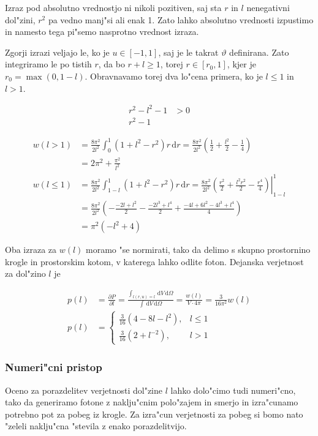 \documentclass[a4paper,10pt]{article}
\renewcommand{\theta}{\vartheta}
\newcommand{\dd}{\,\mathrm{d}}
\begin{document}
Izraz pod absolutno vrednostjo ni nikoli pozitiven, saj sta $r$ in $l$ nenegativni dol"zini, $r^2$ pa vedno manj"si ali enak 1. Zato lahko absolutno vrednosti izpustimo in namesto tega pi"semo nasprotno vrednost izraza. 


Zgorji izrazi veljajo le, ko je $u\in[-1,1]$, saj je le takrat $\theta$ definirana. Zato integriramo le po tistih $r$, da bo $r+l\geq 1$, torej $r\in[r_0,1]$, kjer je $r_0 = \max(0,1-l)$. Obravnavamo torej dva lo"cena primera, ko je $l\leq 1$ in $l>1$. 

\begin{align}
 r^2 - l^2 - 1 &> 0 \\
 r^2 - 1 
\end{align}


\begin{align}
w(l>1) &= \frac{8\pi^2}{2l^2}\int_0^1 (1 + l^2 - r^2 ) r \dd r = \frac{8\pi^2}{2l^2} \left(\frac{1}{2} + \frac{l^2}{2} - \frac{1}{4}\right) \\
 &= 2\pi^2 + \frac{\pi^2}{l^2} \\
w(l\leq 1) &= \frac{8\pi^2}{2l^2}\int_{1-l}^1 (1 + l^2 - r^2 ) r \dd r = \frac{8\pi^2}{2l^2} \left.\left(\frac{r^2}{2} + \frac{l^2r^2}{2} - \frac{r^4}{4}\right)\right|_{1-l}^{1} \\
&= \frac{8\pi^2}{2l^2} \left( - \frac{-2l+l^2}{2} - \frac{-2l^3+l^4}{2} + \frac{-4l+6l^2 - 4l^3 + l^4}{4}\right) \\
&= \pi^2 \left( -l^2 + 4 \right)
\end{align}

Oba izraza za $w(l)$ moramo "se normirati, tako da delimo s skupno prostornino krogle in prostorskim kotom, v katerega lahko odlite foton. Dejanska verjetnost za dol"zino $l$ je 

\begin{align}
 p(l) &= \frac{\partial P}{\partial l} = \frac{\int_{l(r,u)=l} \dd V \dd \Omega}{\int \dd V \dd \Omega} = \frac{w(l)}{ V \cdot 4\pi } = \frac{3}{16\pi^2}w(l)\\
 p(l) &= \left\{ \begin{matrix}
                  \frac{3}{16}(4-8l-l^2), & l \leq 1 \\
		  \frac{3}{16}(2 + l^{-2}), & l > 1
                 \end{matrix}
 \right.
\end{align}

\subsubsection{Numeri"cni pristop}
Oceno za porazdelitev verjetnosti dol"zine $l$ lahko dolo"cimo tudi numeri"cno, tako da generiramo fotone z naklju"cnim polo"zajem in smerjo in izra"cunamo potrebno pot za pobeg iz krogle. Za izra"cun verjetnosti za pobeg si bomo nato "zeleli naklju"cna "stevila z enako porazdelitvijo. 
\end{document}
